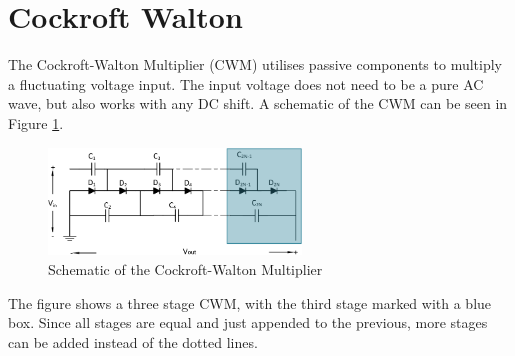 \section{Cockroft Walton}\label{ch:cock}
The Cockroft-Walton Multiplier (CWM) utilises passive components to multiply a fluctuating voltage input.
The input voltage does not need to be a pure AC wave,
but also works with any DC shift.
A schematic of the CWM can be seen in Figure \ref{fig:CWM}.

\begin{figure}[H]
   \centering
   \includegraphics[width=0.6\textwidth]{figures/xCockroftWalton/CockroftWalton.pdf}
    \caption{Schematic of the Cockroft-Walton Multiplier}
	\label{fig:CWM}
\end{figure}

The figure shows a three stage CWM,
with the third stage marked with a blue box.
Since all stages are equal and just appended to the previous,
more stages can be added instead of the dotted lines.

